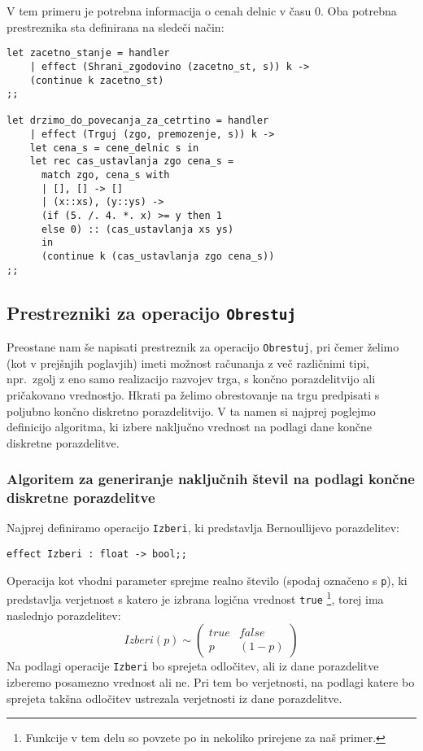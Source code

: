 \documentclass[a4paper,12pt]{article}
\theoremstyle{definition} %
\begin{document}
V tem primeru je potrebna informacija o cenah delnic v času 0. Oba potrebna prestreznika sta definirana na sledeči način:
\begin{lstlisting}
let zacetno_stanje = handler
    | effect (Shrani_zgodovino (zacetno_st, s)) k ->
    (continue k zacetno_st)
;;

let drzimo_do_povecanja_za_cetrtino = handler
    | effect (Trguj (zgo, premozenje, s)) k ->
    let cena_s = cene_delnic s in
    let rec cas_ustavlanja zgo cena_s =
      match zgo, cena_s with
      | [], [] -> []
      | (x::xs), (y::ys) -> 
      (if (5. /. 4. *. x) >= y then 1 
      else 0) :: (cas_ustavlanja xs ys)
      in
      (continue k (cas_ustavlanja zgo cena_s))
;;
\end{lstlisting}

\subsection{Prestrezniki za operacijo \lstinline{Obrestuj}}

Preostane nam še napisati prestreznik za operacijo \lstinline{Obrestuj}, pri čemer želimo (kot v prejšnjih poglavjih) imeti možnost računanja z več različnimi tipi, npr.\ zgolj z eno samo realizacijo razvojev trga, s končno porazdelitvijo ali pričakovano vrednostjo. Hkrati pa želimo obrestovanje na trgu predpisati s poljubno končno diskretno porazdelitvijo. V ta namen si najprej poglejmo definicijo algoritma, ki izbere naključno vrednost na podlagi dane končne diskretne porazdelitve.

\subsubsection*{Algoritem za generiranje naključnih števil na podlagi končne diskretne porazdelitve}

Najprej definiramo operacijo \lstinline{Izberi}, ki predstavlja Bernoullijevo porazdelitev:
\begin{lstlisting}
effect Izberi : float -> bool;;
\end{lstlisting}
Operacija kot vhodni parameter sprejme realno število (spodaj označeno s \lstinline{p}), ki predstavlja verjetnost s katero je izbrana logična vrednost \lstinline{true} \footnote{Funkcije v tem delu so povzete po \cite{examples} in nekoliko prirejene za naš primer.}, torej ima naslednjo porazdelitev:
\[ Izberi( p) \sim  \left( \begin{array}{cc}
true & false  \\
p & (1 - p)  \end{array} \right)\] 
Na podlagi operacije \lstinline{Izberi} bo sprejeta odločitev, ali iz dane porazdelitve izberemo posamezno vrednost ali ne. Pri tem bo verjetnosti, na podlagi katere bo sprejeta takšna odločitev ustrezala verjetnosti iz dane porazdelitve.
\end{document}
